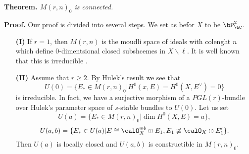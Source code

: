 \medskip
\noindent
{\bfseries {} Theorem. \label{art12-thm-3.10}} \textit{$M(r,n)_{0}$ is connected.}

\medskip
\noindent
{\bfseries Proof.} Our proof is divided into several steps. We set as befor $X$ to be $\bP_{\bC}^{2}$.

\begin{itemize}
\item[\bf(I)] If $r=1$, then $M(r,n)$ is the moudli space of ideals with colenght $n$ which define $0$-dimentsional closed subshcemes in $X\backslash \ell$. It is well known that this is irreducible \cite{art12-key2}.

\item[\bf(II)] Assume that $r \geq 2$. By Hulek's result we see that
$$
U(0)= \{E_{*} \in M (r, n)_{0} | H^{0}(x, E)=H^{0}(X, E^{\vee})= 0\}
$$
is irreducible. In fact, we have a surjective morphism of a $PGL(r)$-bundle over Hulek's parameter space of $s$-stable bundles to $U(0)$. Let us set
$$
U(a)=\{E_{*} \in M (r, n)_{0} | \dim H^{0}(X, E)= a\},
$$
$$
U(a, b) = \{E_{*} \in U(a) | E\cong \calO_{X}^{\oplus b} \oplus E_{1}, E_{1} \ncong \calO_{X}\oplus E_{1}'\}.
$$
Then $U(a)$ is locally closed and $U(a,b)$ is constructible in $M(r,n)_{0}$.


\end{itemize}
